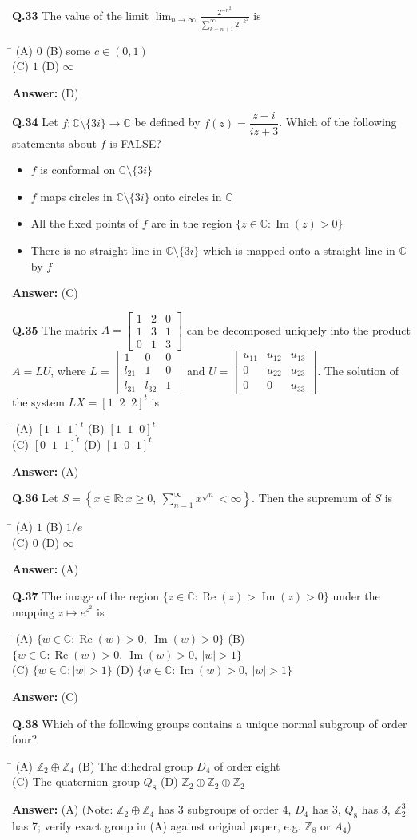 \documentclass[11pt,a4paper]{article}
\newcommand{\optsfourA}[4]{%
  \begin{tabbing}
    \hspace{0.48\linewidth}\=\kill
    (A) #1 \> (B) #2 \\[2pt]
    (C) #3 \> (D) #4
  \end{tabbing}%
}
\newcommand{\optslistA}[4]{%
  \begin{itemize}
    \setlength{\itemsep}{2pt}\setlength{\parskip}{0pt}
    \item[(A)] #1
    \item[(B)] #2
    \item[(C)] #3
    \item[(D)] #4
  \end{itemize}%
}
\newcommand{\ans}[1]{\textbf{Answer:} #1\par\medskip}
\begin{document}
\textbf{Q.33} The value of the limit $\displaystyle\lim_{n\to\infty} \frac{2^{-n^2}}{\sum_{k=n+1}^{\infty} 2^{-k^2}}$ is
\optsfourA{$0$}{some $c \in (0, 1)$}{$1$}{$\infty$}
\ans{(D)}

\textbf{Q.34} Let $f : \mathbb{C} \setminus \{3i\} \to \mathbb{C}$ be defined by $f(z) = \dfrac{z - i}{iz + 3}$. Which of the following statements about $f$ is FALSE?
\optslistA{$f$ is conformal on $\mathbb{C} \setminus \{3i\}$}{$f$ maps circles in $\mathbb{C} \setminus \{3i\}$ onto circles in $\mathbb{C}$}{All the fixed points of $f$ are in the region $\{z \in \mathbb{C} : \operatorname{Im}(z) > 0\}$}{There is no straight line in $\mathbb{C} \setminus \{3i\}$ which is mapped onto a straight line in $\mathbb{C}$ by $f$}
\ans{(C)}

\textbf{Q.35} The matrix $A = \begin{bmatrix} 1 & 2 & 0 \\ 1 & 3 & 1 \\ 0 & 1 & 3 \end{bmatrix}$ can be decomposed uniquely into the product $A = LU$, where $L = \begin{bmatrix} 1 & 0 & 0 \\ l_{21} & 1 & 0 \\ l_{31} & l_{32} & 1 \end{bmatrix}$ and $U = \begin{bmatrix} u_{11} & u_{12} & u_{13} \\ 0 & u_{22} & u_{23} \\ 0 & 0 & u_{33} \end{bmatrix}$. The solution of the system $LX = [1\;\;2\;\;2]^t$ is
\optsfourA{$[1\;\;1\;\;1]^t$}{$[1\;\;1\;\;0]^t$}{$[0\;\;1\;\;1]^t$}{$[1\;\;0\;\;1]^t$}
\ans{(A)}

\textbf{Q.36} Let $S = \left\{x \in \mathbb{R} : x \ge 0,\ \displaystyle\sum_{n=1}^{\infty} x^{\sqrt{n}} < \infty\right\}$. Then the supremum of $S$ is
\optsfourA{$1$}{$1/e$}{$0$}{$\infty$}
\ans{(A)}

\textbf{Q.37} The image of the region $\{z \in \mathbb{C} : \operatorname{Re}(z) > \operatorname{Im}(z) > 0\}$ under the mapping $z \mapsto e^{z^2}$ is
\optsfourA{$\{w \in \mathbb{C} : \operatorname{Re}(w) > 0,\ \operatorname{Im}(w) > 0\}$}{$\{w \in \mathbb{C} : \operatorname{Re}(w) > 0,\ \operatorname{Im}(w) > 0,\ |w| > 1\}$}{$\{w \in \mathbb{C} : |w| > 1\}$}{$\{w \in \mathbb{C} : \operatorname{Im}(w) > 0,\ |w| > 1\}$}
\ans{(C)}

\textbf{Q.38} Which of the following groups contains a unique normal subgroup of order four?
\optsfourA{$\mathbb{Z}_2 \oplus \mathbb{Z}_4$}{The dihedral group $D_4$ of order eight}{The quaternion group $Q_8$}{$\mathbb{Z}_2 \oplus \mathbb{Z}_2 \oplus \mathbb{Z}_2$}
\ans{(A) (Note: $\mathbb{Z}_2 \oplus \mathbb{Z}_4$ has 3 subgroups of order 4, $D_4$ has 3, $Q_8$ has 3, $\mathbb{Z}_2^3$ has 7; verify exact group in (A) against original paper, e.g. $\mathbb{Z}_8$ or $A_4$)}
\end{document}
